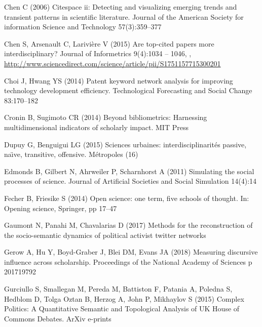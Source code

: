 \begin{thebibliography}{84}
Chen C (2006) Citespace ii: Detecting and visualizing emerging trends and
  transient patterns in scientific literature. Journal of the American Society
  for information Science and Technology 57(3):359--377

Chen S, Arsenault C, Larivière V (2015) Are top-cited papers more
  interdisciplinary? Journal of Informetrics 9(4):1034 -- 1046,
  ,
  \urlprefix\url{http://www.sciencedirect.com/science/article/pii/S1751157715300201}

Choi J, Hwang YS (2014) Patent keyword network analysis for improving
  technology development efficiency. Technological Forecasting and Social
  Change 83:170--182

Cronin B, Sugimoto CR (2014) Beyond bibliometrics: Harnessing multidimensional
  indicators of scholarly impact. MIT Press

Dupuy G, Benguigui LG (2015) Sciences urbaines: interdisciplinarit{\'e}s
  passive, na{\"\i}ve, transitive, offensive. M{\'e}tropoles (16)

Edmonds B, Gilbert N, Ahrweiler P, Scharnhorst A (2011) Simulating the social
  processes of science. Journal of Artificial Societies and Social Simulation
  14(4):14

Fecher B, Friesike S (2014) Open science: one term, five schools of thought.
  In: Opening science, Springer, pp 17--47

Gaumont N, Panahi M, Chavalarias D (2017) Methods for the reconstruction of the
  socio-semantic dynamics of political activist twitter networks

Gerow A, Hu Y, Boyd-Graber J, Blei DM, Evans JA (2018) Measuring discursive
  influence across scholarship. Proceedings of the National Academy of Sciences
  p 201719792

{Gurciullo} S, {Smallegan} M, {Pereda} M, {Battiston} F, {Patania} A, {Poledna}
  S, {Hedblom} D, {Tolga Oztan} B, {Herzog} A, {John} P, {Mikhaylov} S (2015)
  {Complex Politics: A Quantitative Semantic and Topological Analysis of UK
  House of Commons Debates}. ArXiv e-prints 


\end{thebibliography}
